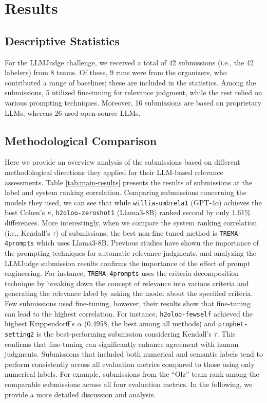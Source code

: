 \section{Results}
\label{sec:results}



\subsection{Descriptive Statistics}
For the LLMJudge challenge, we received a total of 42 submissions (i.e., the 42 labelers) from 8 teams. Of these, 9 runs were from the organizers, who contributed a range of baselines; these are included in the statistics. Among the submissions, 5 utilized fine-tuning for relevance judgment, while the rest relied on various prompting techniques. Moreover, 16 submissions are based on proprietary LLMs, whereas 26 used open-source LLMs.

\subsection{Methodological Comparison}
Here we provide an overview analysis of the submissions based on different methodological directions they applied for their LLM-based relevance assessments. Table \ref{tab:main-results} presents the results of submissions at the label and system ranking correlation. Comparing submissions concerning the models they used, we can see that while \texttt{willia-umbrela1} (GPT-4o) achieves the best Cohen's $\kappa$, \texttt{h2oloo-zeroshot1} (Llama3-8B) ranked second by only 1.61\% differences. More interestingly, when we compare the system ranking correlation (i.e., Kendall's $\tau$) of submissions, the best non-fine-tuned method is \texttt{TREMA-4prompts} which uses Llama3-8B. Previous studies \cite{thomas2023large,rahmani2024judgeblender} have shown the importance of the prompting techniques for automatic relevance judgments, and analyzing the LLMJudge submission results confirms the importance of the effect of prompt engineering. For instance, \texttt{TREMA-4prompts} uses the criteria decomposition technique by breaking down the concept of relevance into various criteria and generating the relevance label by asking the model about the specified criteria. Few submissions used fine-tuning, however, their results show that fine-tuning can lead to the highest correlation. For instance, \texttt{h2oloo-fewself} achieved the highest Krippendorff's $\alpha$ (0.4958, the best among all methods) and \texttt{prophet-setting2} is the best-performing submission considering Kendall's $\tau$. This confirms that fine-tuning can significantly enhance agreement with human judgments. Submissions that included both numerical and semantic labels tend to perform consistently across all evaluation metrics compared to those using only numerical labels. For example, submissions from the ``Olz'' team rank among the comparable submissions across all four evaluation metrics. In the following, we provide a more detailed discussion and analysis.

